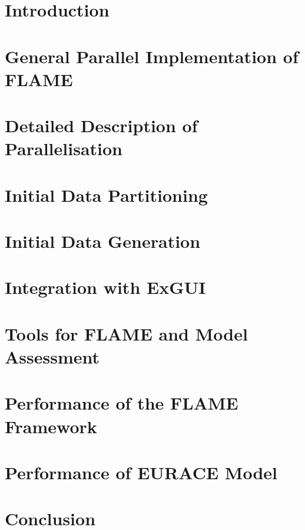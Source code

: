 \documentclass[a4paper,11pt]{article}
\begin{document}
\section{Introduction}	
\section{General Parallel Implementation of FLAME} 
\section{Detailed Description of Parallelisation} 
\section{Initial Data Partitioning} 
\section{Initial Data Generation} 
\section{Integration with ExGUI} 
\section{Tools for FLAME and Model Assessment} 
\section{Performance of the FLAME Framework} 
\section{Performance of EURACE Model} 
\section{Conclusion} 

\newpage
\appendix 

\end{document}
